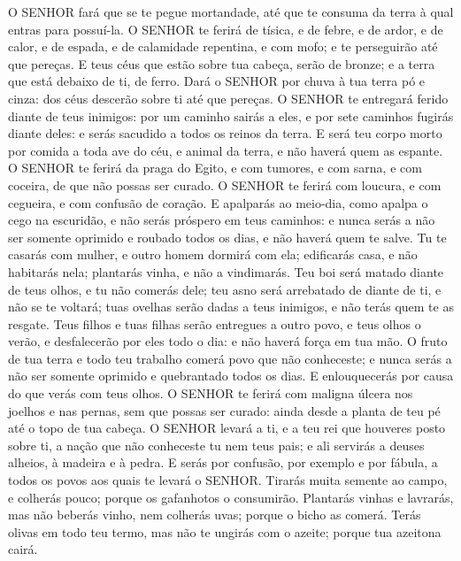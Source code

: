 {{  O SENHOR fará que se te pegue mortandade, até que te consuma da terra à qual entras para possuí-la.
  O SENHOR te ferirá de tísica, e de febre, e de ardor, e de calor, e de espada, e de calamidade repentina, e com mofo; e te perseguirão até que pereças.
  E teus céus que estão sobre tua cabeça, serão de bronze; e a terra que está debaixo de ti, de ferro.
  Dará o SENHOR por chuva à tua terra pó e cinza: dos céus descerão sobre ti até que pereças.
  O SENHOR te entregará ferido diante de teus inimigos: por um caminho sairás a eles, e por sete caminhos fugirás diante deles: e serás sacudido a todos os reinos da terra.
  E será teu corpo morto por comida a toda ave do céu, e animal da terra, e não haverá quem as espante.
  O SENHOR te ferirá da praga do Egito, e com tumores, e com sarna, e com coceira, de que não possas ser curado.
  O SENHOR te ferirá com loucura, e com cegueira, e com confusão de coração.
  E apalparás ao meio-dia, como apalpa o cego na escuridão, e não serás próspero em teus caminhos: e nunca serás a não ser somente oprimido e roubado todos os dias, e não haverá quem te salve.
  Tu te casarás com mulher, e outro homem dormirá com ela; edificarás casa, e não habitarás nela; plantarás vinha, e não a vindimarás.
  Teu boi será matado diante de teus olhos, e tu não comerás dele; teu asno será arrebatado de diante de ti, e não se te voltará; tuas ovelhas serão dadas a teus inimigos, e não terás quem te as resgate.
  Teus filhos e tuas filhas serão entregues a outro povo, e teus olhos o verão, e desfalecerão por eles todo o dia: e não haverá força em tua mão.
  O fruto de tua terra e todo teu trabalho comerá povo que não conheceste; e nunca serás a não ser somente oprimido e quebrantado todos os dias.
  E enlouquecerás por causa do que verás com teus olhos.
  O SENHOR te ferirá com maligna úlcera nos joelhos e nas pernas, sem que possas ser curado: ainda desde a planta de teu pé até o topo de tua cabeça.
  O SENHOR levará a ti, e a teu rei que houveres posto sobre ti, a nação que não conheceste tu nem teus pais; e ali servirás a deuses alheios, à madeira e à pedra.
  E serás por confusão, por exemplo e por fábula, a todos os povos aos quais te levará o SENHOR.
  Tirarás muita semente ao campo, e colherás pouco; porque os gafanhotos o consumirão. %
  Plantarás vinhas e lavrarás, mas não beberás vinho, nem colherás uvas; porque o bicho as comerá.
  Terás olivas em todo teu termo, mas não te ungirás com o azeite; porque tua azeitona cairá.
}}
